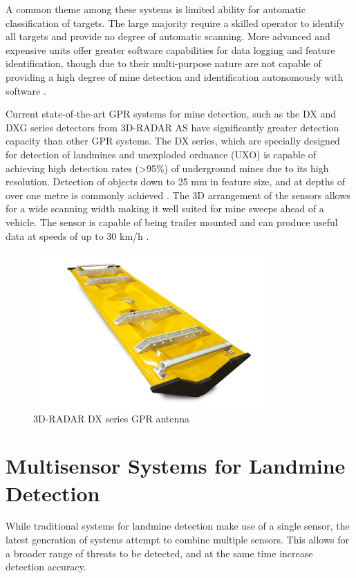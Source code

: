 \documentclass[main.tex]{subfiles}
\begin{document}
\begin{appendices}
A common theme among these systems is limited ability for automatic classification of targets. The large majority require a skilled operator to identify all targets and provide no degree of automatic scanning. More advanced and expensive units offer greater software capabilities for data logging and feature identification, though due to their multi-purpose nature are not capable of providing a high degree of mine detection and identification autonomously with software \parencite{rd8000}.

Current state-of-the-art GPR systems for mine detection, such as the DX and DXG series detectors from 3D-RADAR AS have significantly greater detection capacity than other GPR systems. The DX series, which are specially designed for detection of landmines and unexploded ordnance (UXO) is capable of achieving high detection rates (>95\%) of underground mines due to its high resolution. Detection of objects down to 25 mm in feature size, and at depths of over one metre is commonly achieved \parencite{3dradarDX}. The 3D arrangement of the sensors allows for a wide scanning width making it well suited for mine sweeps ahead of a vehicle. The sensor is capable of being trailer mounted and can produce useful data at speeds of up to 30 km/h \parencite{3dradarDX}.

\begin{figure}[ht]
\centering
\includegraphics[width=0.8\textwidth]{8-Appendices/DX-Series-Antenna-Profile.jpg}
\caption[3D-RADAR DX series GPR antenna]{3D-RADAR DX series GPR antenna \parencite{3dradarDX}}
\end{figure}

\section{Multisensor Systems for Landmine Detection}
While traditional systems for landmine detection make use of a single sensor, the latest generation of systems attempt to combine multiple sensors. This allows for a broader range of threats to be detected, and at the same time increase detection accuracy.  


\end{appendices}
\end{document}
